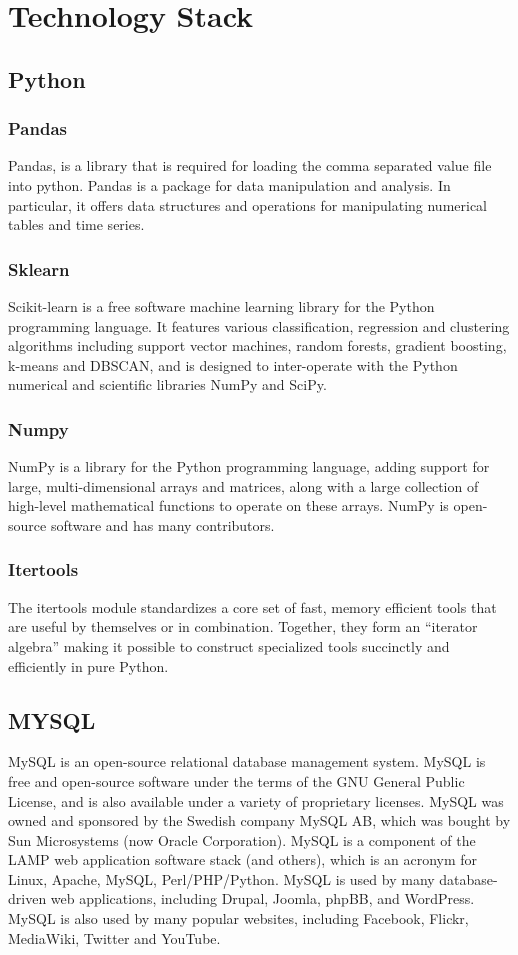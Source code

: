 \documentclass[12pt]{article}
\begin{document}
\newpage
\section{Technology Stack}
\subsection{Python}
\subsubsection{Pandas}
Pandas, is a library that is required for loading the comma separated value file into python. Pandas is a package for data manipulation and analysis. In particular, it offers data structures and operations for manipulating numerical tables and time series.

\subsubsection{Sklearn}
Scikit-learn is a free software machine learning library for the Python programming language. It features various classification, regression and clustering algorithms including support vector machines, random forests, gradient boosting, k-means and DBSCAN, and is designed to inter-operate with the Python numerical and scientific libraries NumPy and SciPy.

\subsubsection{Numpy}
NumPy is a library for the Python programming language, adding support for large, multi-dimensional arrays and matrices, along with a large collection of high-level mathematical functions to operate on these arrays. NumPy is open-source software and has many contributors.

\subsubsection{Itertools}
The itertools module standardizes a core set of fast, memory efficient tools that are useful by themselves or in combination. Together, they form an “iterator algebra” making it possible to construct specialized tools succinctly and efficiently in pure Python.

\subsection{MYSQL}
MySQL is an open-source relational database management system. MySQL is free and open-source software under the terms of the GNU General Public License, and is also available under a variety of proprietary licenses. MySQL was owned and sponsored by the Swedish company MySQL AB, which was bought by Sun Microsystems (now Oracle Corporation). MySQL is a component of the LAMP web application software stack (and others), which is an acronym for Linux, Apache, MySQL, Perl/PHP/Python. MySQL is used by many database-driven web applications, including Drupal, Joomla, phpBB, and WordPress. MySQL is also used by many popular websites, including Facebook, Flickr, MediaWiki, Twitter and YouTube.
\end{document}
